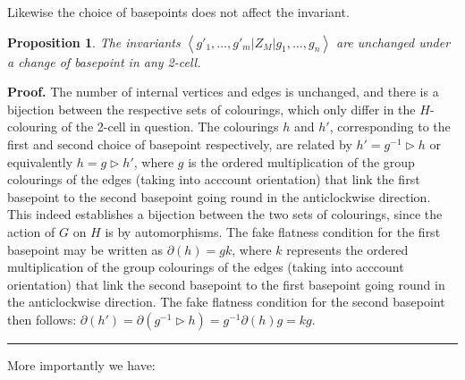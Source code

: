 \documentclass[a4paper,11pt]{article}
\newtheorem{Proposition}[Theorem]{Proposition}
\newenvironment{Proof}[1][Proof]{\textbf{#1.} }{\ \rule{0.5em}{0.5em}}
\begin{document}
Likewise the choice of basepoints does not affect the invariant.

\begin{Proposition}
The invariants $\left \langle g'_1,\dots , g'_m \left | Z_M \right |g_1,\dots , g_n   \right \rangle$ are unchanged under a change of basepoint in any 2-cell.
\label{prop:start}
\end{Proposition}


\begin{Proof} The number of internal vertices and edges is unchanged, and there is a bijection between the respective sets of colourings, which only differ in the $H$-colouring of the 2-cell in question. The colourings $h$ and $h'$, corresponding to the first and second choice of basepoint respectively, are related by $h'= g^{-1} \triangleright h $ or equivalently $h= g \triangleright h' $, where $g$ is the ordered multiplication of the group colourings of the edges (taking into acccount orientation) that link the first basepoint to the second basepoint going round in the anticlockwise direction. This indeed establishes a bijection between the two sets of colourings, since the action of $G$ on $H$ is by automorphisms. The fake flatness condition for the first basepoint may be written as $\partial(h)=gk$, where $k$ represents the ordered multiplication of the group colourings of the edges (taking into acccount orientation) that link the second basepoint to the first basepoint going round in the anticlockwise direction. The fake flatness condition for the second basepoint then follows: $
\partial(h') = \partial(g^{-1} \triangleright h) = g^{-1} \partial(h) g = kg $.
\end{Proof}



\vskip 0.1cm

More importantly we have:
\end{document}
